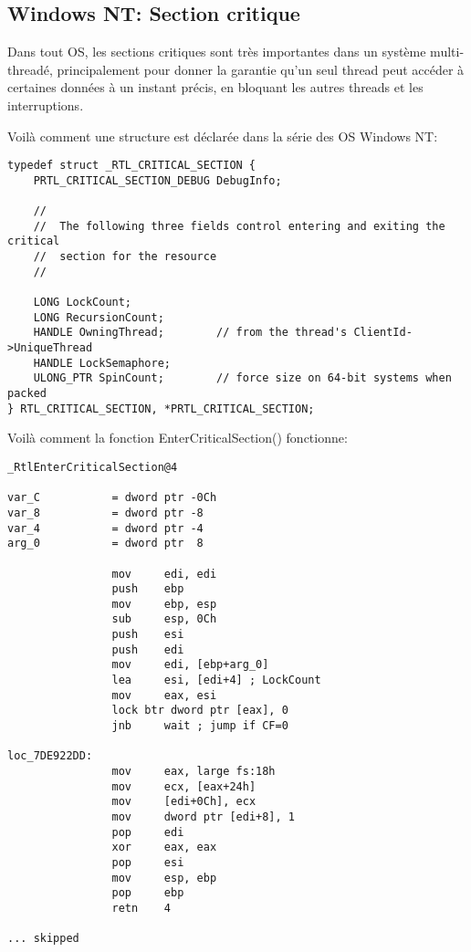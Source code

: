 \subsection{Windows NT: Section critique}

\label{critical_sections}


Dans tout \ac{OS}, les sections critiques sont très importantes dans un système
multi-threadé,
principalement  pour donner la garantie qu'un seul thread peut
accéder à certaines données à un instant précis, en bloquant les autres
threads et les interruptions.

\par
Voilà comment une structure  est déclarée dans la série des
OS \gls{Windows NT}:

\begin{lstlisting}[caption=(Windows Research Kernel v1.2) public/sdk/inc/nturtl.h,style=customc]
typedef struct _RTL_CRITICAL_SECTION {
    PRTL_CRITICAL_SECTION_DEBUG DebugInfo;

    //
    //  The following three fields control entering and exiting the critical
    //  section for the resource
    //

    LONG LockCount;
    LONG RecursionCount;
    HANDLE OwningThread;        // from the thread's ClientId->UniqueThread
    HANDLE LockSemaphore;
    ULONG_PTR SpinCount;        // force size on 64-bit systems when packed
} RTL_CRITICAL_SECTION, *PRTL_CRITICAL_SECTION;
\end{lstlisting}

Voilà comment la fonction EnterCriticalSection() fonctionne:

\begin{lstlisting}[caption=Windows 2008/ntdll.dll/x86 (begin),style=customasmx86]
_RtlEnterCriticalSection@4

var_C           = dword ptr -0Ch
var_8           = dword ptr -8
var_4           = dword ptr -4
arg_0           = dword ptr  8

                mov     edi, edi
                push    ebp
                mov     ebp, esp
                sub     esp, 0Ch
                push    esi
                push    edi
                mov     edi, [ebp+arg_0]
                lea     esi, [edi+4] ; LockCount
                mov     eax, esi
                lock btr dword ptr [eax], 0
                jnb     wait ; jump if CF=0

loc_7DE922DD:
                mov     eax, large fs:18h
                mov     ecx, [eax+24h]
                mov     [edi+0Ch], ecx
                mov     dword ptr [edi+8], 1
                pop     edi
                xor     eax, eax
                pop     esi
                mov     esp, ebp
                pop     ebp
                retn    4

... skipped
\end{lstlisting}

